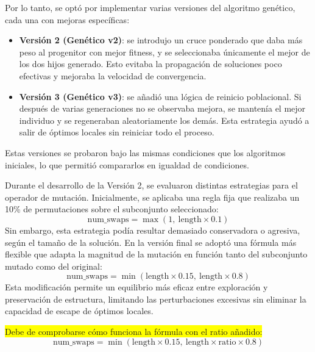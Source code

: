 Por lo tanto, se optó por implementar varias versiones del algoritmo genético, cada una con mejoras específicas:


\begin{itemize}
    \item \textbf{Versión 2 (Genético v2)}: se introdujo un cruce ponderado que daba más peso al progenitor con mejor fitness,
          y se seleccionaba únicamente el mejor de los dos hijos generado.
          Esto evitaba la propagación de soluciones poco efectivas y mejoraba la velocidad de convergencia.
    \item \textbf{Versión 3 (Genético v3)}: se añadió una lógica de reinicio poblacional. Si después de varias generaciones
          no se observaba mejora, se mantenía el mejor individuo y se regeneraban aleatoriamente los demás.
          Esta estrategia ayudó a salir de óptimos locales sin reiniciar todo el proceso.
\end{itemize}

Estas versiones se probaron bajo las mismas condiciones que los algoritmos iniciales, lo que permitió compararlos en igualdad de condiciones.


Durante el desarrollo de la Versión 2, se evaluaron distintas estrategias para el operador de mutación.
Inicialmente, se aplicaba una regla fija que realizaba un 10\% de permutaciones sobre el subconjunto seleccionado:
\[
    \mathrm{num\_swaps} = \max\left(1,\ \mathrm{length} \times 0.1\right)
\]
Sin embargo, esta estrategia podía resultar demasiado conservadora o agresiva, según el tamaño de la solución.
En la versión final se adoptó una fórmula más flexible que adapta la magnitud de la mutación en función tanto del subconjunto mutado como del original:
\[
    \mathrm{num\_swaps} = \min\left(\mathrm{length} \times 0.15,\ \mathrm{length} \times 0.8\right)
\]
Esta modificación permite un equilibrio más eficaz entre exploración y preservación de estructura, limitando las perturbaciones excesivas sin eliminar la capacidad de escape de óptimos locales.

\colorbox{yellow}{Debe de comprobarse cómo funciona la fórmula con el ratio añadido:}
\[
    \mathrm{num\_swaps} = \min\left(\mathrm{length} \times 0.15,\ \mathrm{length} \times \mathrm{ratio} \times 0.8\right)
\]


